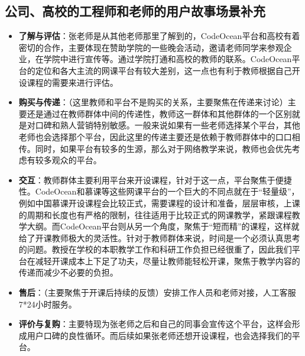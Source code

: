 \documentclass[a4paper]{ctexart}
\begin{document}
\subsection{公司、高校的工程师和老师的用户故事场景补充}
\begin{itemize}
  \item \textbf{了解与评估}：张老师是从其他老师那里了解到的，CodeOcean平台和高校有着密切的合作，主要体现在赞助学院的一些晚会活动，邀请老师同学来参观企业，在学院中进行宣传等。通过学院打通和高校的教师的联系。CodeOcean平台的定位和各大主流的网课平台有较大差别，这一点也有利于教师根据自己开设课程的需要来进行评估。
  \item \textbf{购买与传递}：（这里教师和平台不是购买的关系，主要聚焦在传递来讨论）主要还是通过在教师群体中间的传递性，教师这一群体和其他群体的一个区别就是对口碑和熟人营销特别敏感。一般来说如果有一些老师选择某个平台，其他老师也会选择那个平台，因此这里的传递主要还是依赖于教师群体中的口口相传。同时，如果平台有较多的生源，那么对于网络教学来说，教师也会优先考虑有较多观众的平台。
  \item \textbf{交互}：教师群体主要利用平台来开设课程，针对于这一点，平台聚焦于便捷性。CodeOcean和慕课等这些网课平台的一个巨大的不同点就在于“轻量级”，例如中国慕课开设课程会比较正式，需要课程的设计和准备，层层审核，上课的周期和长度也有严格的限制，往往适用于比较正式的网课教学，紧跟课程教学大纲。而CodeOcean平台则从另一个角度，聚焦于“短而精”的课程，这样就给了开课教师极大的灵活性。针对于教师群体来说，时间是一个必须认真思考的问题。教授在学校的本职教学工作和科研工作负担已经很重了，因此我们平台在减轻开课成本上下足了功夫，尽量让教师能轻松开课，聚焦于教学内容的传递而减少不必要的负担。
  \item \textbf{售后}：（主要聚焦于开课后持续的反馈）安排工作人员和老师对接，人工客服7*24小时服务。
  \item \textbf{评价与复购}：主要特现为张老师之后和自己的同事会宣传这个平台，这样会形成用户口碑的良性循环。而后续如果张老师还想开设课程，也会选择我们的平台。
\end{itemize}
\end{document}
